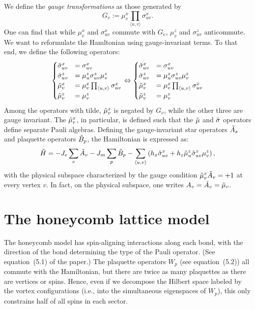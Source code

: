 \documentclass{article}
\begin{document}
We define the \emph{gauge transformations} as those generated by
\[
    G_v := \mu_v^x \prod_{\langle u, v\rangle} \sigma_{uv}^x.
\]
One can find that while $\mu_v^x$ and $\sigma_{uv}^x$ commute with $G_v$,
$\mu_v^z$ and $\sigma_{uv}^z$ anticommute.
We want to reformulate the Hamltonian using gauge-invariant terms.
To that end, we define the following operators:
\[
    \begin{cases}
        \Tilde\sigma_{uv}^x &= \sigma_{uv}^x \\
        \Tilde\sigma_{uv}^z &= \mu_u^z \sigma_{uv}^z \mu_v^z \\
        \Tilde\mu_v^x       &= \mu_v^x \prod_{\langle u, v\rangle} \sigma_{uv}^x \\
        \Tilde\mu_v^z       &= \mu_v^z
    \end{cases}
    \Leftrightarrow
    \begin{cases}
        \Tilde\sigma_{uv}^x &= \sigma_{uv}^x \\
        \Tilde\sigma_{uv}^z &= \mu_u^z \sigma_{uv}^z \mu_v^z \\
        \Tilde\mu_v^x       &= \mu_v^x \prod_{\langle u, v\rangle} \sigma_{uv}^x \\
        \Tilde\mu_v^z       &= \mu_v^z
    \end{cases}
\]
Among the operators with tilde, $\Tilde\mu_v^z$ is negated by $G_v$,
while the other three are gauge invariant.
The $\Tilde\mu_v^x$, in particular, is defined such that
the $\Tilde\mu$ and $\Tilde\sigma$ operators define separate Pauli algebras.
Defining the gauge-invariant star operators $\Tilde A_s$ and plaquette operators $\Tilde B_p$,
the Hamiltonian is expressed as:
\[
    \Tilde H = -J_e\sum_v\Tilde A_v - J_m\sum_p\Tilde B_p
    -\sum_{\langle u, v\rangle}\left(
        h_x\Tilde\sigma_{uv}^x + h_z\Tilde\mu_u^z\Tilde\sigma_{uv}^z\mu_v^z
    \right),
\]
with the physical subspace characterized by the gauge condition $\Tilde\mu_v^x\Tilde A_v = +1$ at every vertex $v$.
In fact, on the physical subspace, one writes $A_v = \Tilde A_v = \Tilde\mu_v$.

\section{The honeycomb lattice model}
The honeycomb model has spin-aligning interactions along each bond,
with the direction of the bond determining the type of the Pauli operator.
(See equation~(5.1) of the paper.)
The plaquette operators $W_p$ (see equation~(5.2)) all commute with the Hamiltonian,
but there are twice as many plaquettes as there are vertices or spins.
Hence, even if we decompose the Hilbert space labeled by the vortex configurations
(i.e., into the simultaneous eigenspaces of $W_p$),
this only constrains half of all spins in each sector.
\end{document}
